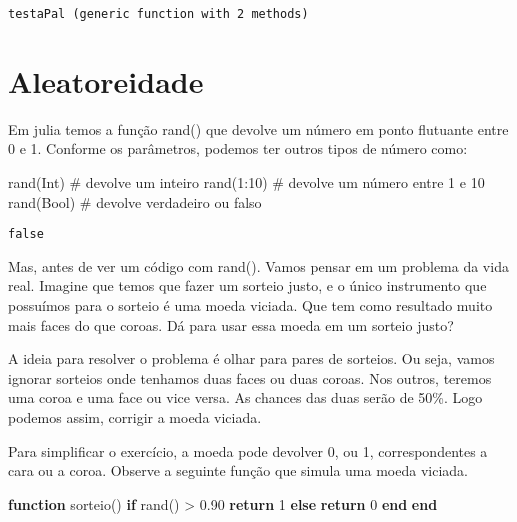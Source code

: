\documentclass[
  letterpaper,
  DIV=11,
  numbers=noendperiod]{scrreprt}
\newenvironment{Shaded}{\begin{snugshade}}{\end{snugshade}}
\newcommand{\CommentTok}[1]{\textcolor[rgb]{0.37,0.37,0.37}{#1}}
\newcommand{\ControlFlowTok}[1]{\textcolor[rgb]{0.00,0.23,0.31}{\textbf{#1}}}
\newcommand{\DataTypeTok}[1]{\textcolor[rgb]{0.68,0.00,0.00}{#1}}
\newcommand{\FloatTok}[1]{\textcolor[rgb]{0.68,0.00,0.00}{#1}}
\newcommand{\FunctionTok}[1]{\textcolor[rgb]{0.28,0.35,0.67}{#1}}
\newcommand{\KeywordTok}[1]{\textcolor[rgb]{0.00,0.23,0.31}{\textbf{#1}}}
\newcommand{\NormalTok}[1]{\textcolor[rgb]{0.00,0.23,0.31}{#1}}
\newcommand{\OperatorTok}[1]{\textcolor[rgb]{0.37,0.37,0.37}{#1}}
\begin{document}
\begin{verbatim}
testaPal (generic function with 2 methods)
\end{verbatim}

\section{Aleatoreidade}\label{aleatoreidade}

Em julia temos a função rand() que devolve um número em ponto flutuante
entre 0 e 1. Conforme os parâmetros, podemos ter outros tipos de número
como:

\begin{Shaded}
\begin{Highlighting}[]
\FunctionTok{rand}\NormalTok{(}\DataTypeTok{Int}\NormalTok{)  }\CommentTok{\# devolve um inteiro}
\FunctionTok{rand}\NormalTok{(}\FloatTok{1}\OperatorTok{:}\FloatTok{10}\NormalTok{) }\CommentTok{\# devolve um número entre 1 e 10}
\FunctionTok{rand}\NormalTok{(}\DataTypeTok{Bool}\NormalTok{) }\CommentTok{\# devolve verdadeiro ou falso}
\end{Highlighting}
\end{Shaded}

\begin{verbatim}
false
\end{verbatim}

Mas, antes de ver um código com rand(). Vamos pensar em um problema da
vida real. Imagine que temos que fazer um sorteio justo, e o único
instrumento que possuímos para o sorteio é uma moeda viciada. Que tem
como resultado muito mais faces do que coroas. Dá para usar essa moeda
em um sorteio justo?

A ideia para resolver o problema é olhar para pares de sorteios. Ou
seja, vamos ignorar sorteios onde tenhamos duas faces ou duas coroas.
Nos outros, teremos uma coroa e uma face ou vice versa. As chances das
duas serão de 50\%. Logo podemos assim, corrigir a moeda viciada.

Para simplificar o exercício, a moeda pode devolver 0, ou 1,
correspondentes a cara ou a coroa. Observe a seguinte função que simula
uma moeda viciada.

\begin{Shaded}
\begin{Highlighting}[]
\KeywordTok{function} \FunctionTok{sorteio}\NormalTok{()}
  \ControlFlowTok{if} \FunctionTok{rand}\NormalTok{() }\OperatorTok{\textgreater{}} \FloatTok{0.90}
    \ControlFlowTok{return} \FloatTok{1}
  \ControlFlowTok{else} 
    \ControlFlowTok{return} \FloatTok{0}
  \ControlFlowTok{end}
\KeywordTok{end}
\end{Highlighting}
\end{Shaded}
\end{document}
